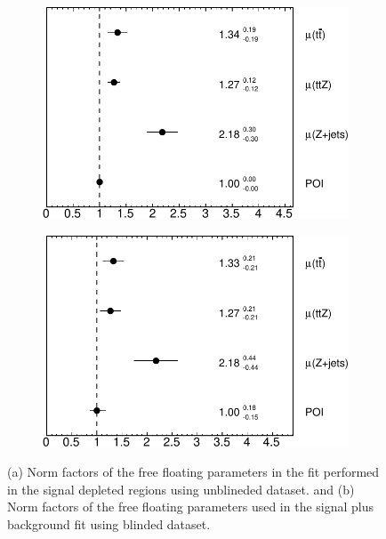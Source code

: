 \begin{figure}[!h] 
  \begin{subfigure}[b]{0.49\linewidth}
    \centering
    \includegraphics[width=\textwidth]{ubonn-thesis/Chapters/Chapters_07/Figure/Asmiov/NormFactors_bkg-crop.pdf}
    \caption{}
    \label{fig:backgroundonly}
  \end{subfigure}%
  \begin{subfigure}[b]{0.49\linewidth}
    \centering
    \includegraphics[width=\textwidth]{ubonn-thesis/Chapters/Chapters_07/Figure/Asmiov/NormFactors-crop.pdf}
   \caption{}
   \label{fig:asimovnormfactor}
  \end{subfigure}
  \caption{(a) Norm factors of the free floating parameters in the fit performed in the signal depleted regions using unblineded dataset.  and (b) Norm factors of the free floating parameters used in the signal plus background fit using blinded dataset.}
\end{figure}

